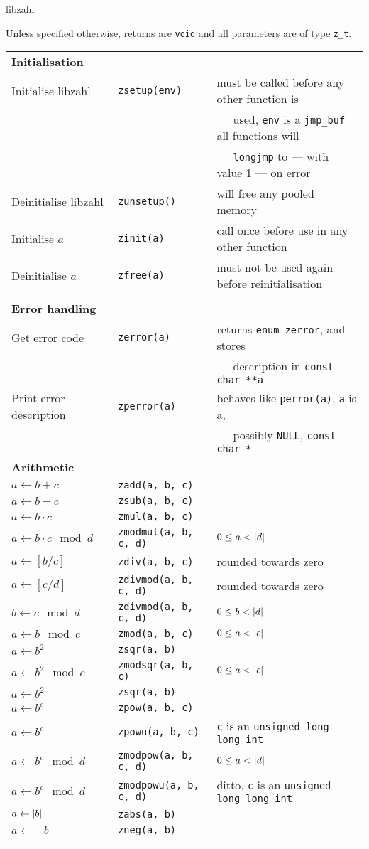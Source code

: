 \documentclass[10pt,draft]{article}
\DeclarePairedDelimiter\ab{\lvert}{\rvert}
\newcommand{\ullong}{{\tt unsigned long long int}}
\newcommand{\entry}[3]{ #2 & {\tt #1} & #3 \\ }
\newcommand{\entrycont}[1]{ & & $~~~~~$ #1 \\ }
\newcommand{\entryTwo}[4]{\entry{#1}{#2}{#3}\entrycont{#4}}
\newcommand{\entryThree}[5]{\entryTwo{#1}{#2}{#3}{#4}\entrycont{#5}}
\begin{document}
{\Huge libzahl}
\vspace{1ex}

Unless specified otherwise, returns are {\tt void} and all parameters are of type {\tt z\_t}.
\vspace{1.5em}



\hspace{-0.8em}
\begin{tabular}{lll}



\textbf{Initialisation} \\
\entryThree{zsetup(env)} {Initialise libzahl}   {must be called before any other function is}
                                                {used, {\tt env} is a {\tt jmp\_buf} all functions will}
                                                {{\tt longjmp} to --- with value 1 --- on error}
\entry     {zunsetup()}  {Deinitialise libzahl} {will free any pooled memory}
\entry     {zinit(a)}    {Initialise $a$}       {call once before use in any other function}
\entry     {zfree(a)}    {Deinitialise $a$}     {must not be used again before reinitialisation}
\\

\textbf{Error handling} \\
\entryTwo{zerror(a)}  {Get error code}          {returns {\tt enum zerror}, and stores}
                                                {description in {\tt const char **a}}
\entryTwo{zperror(a)} {Print error description} {behaves like {\tt perror(a)}, {\tt a} is a,}
                                                {possibly {\tt NULL}, {\tt const char *}}

\textbf{Arithmetic} \\
\entry{zadd(a, b, c)}        {$a \gets b + c$}            {}
\entry{zsub(a, b, c)}        {$a \gets b - c$}            {}
\entry{zmul(a, b, c)}        {$a \gets b \cdot c$}        {}
\entry{zmodmul(a, b, c, d)}  {$a \gets b \cdot c \mod d$} {$0 \le a < \ab{d}$}
\entry{zdiv(a, b, c)}        {$a \gets [b / c]$}          {rounded towards zero}
\entry{zdivmod(a, b, c, d)}  {$a \gets [c / d]$}          {rounded towards zero}
\entry{zdivmod(a, b, c, d)}  {$b \gets c \mod d$}         {$0 \le b < \ab{d}$}
\entry{zmod(a, b, c)}        {$a \gets b \mod c$}         {$0 \le a < \ab{c}$}
\entry{zsqr(a, b)}           {$a \gets b^2$}              {}
\entry{zmodsqr(a, b, c)}     {$a \gets b^2 \mod c$}       {$0 \le a < \ab{c}$}
\entry{zsqr(a, b)}           {$a \gets b^2$}              {}
\entry{zpow(a, b, c)}        {$a \gets b^c$}              {}
\entry{zpowu(a, b, c)}       {$a \gets b^c$}              {{\tt c} is an \ullong{}}
\entry{zmodpow(a, b, c, d)}  {$a \gets b^c \mod d$}       {$0 \le a < \ab{d}$}
\entry{zmodpowu(a, b, c, d)} {$a \gets b^c \mod d$}       {ditto, {\tt c} is an \ullong{}}
\entry{zabs(a, b)}           {$a \gets \ab{b}$}           {}
\entry{zneg(a, b)}           {$a \gets -b$}               {}
\\


\end{tabular}
\end{document}
